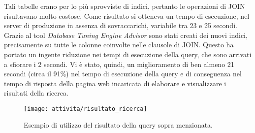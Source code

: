 Tali tabelle erano per lo più sprovviste di indici, pertanto le operazioni di JOIN risultavano molto costose. Come risultato si otteneva un tempo di esecuzione, nel server di produzione in assenza di sovraccarichi, variabile tra 23 e 25 secondi. Grazie al tool \textit{Database Tuning Engine Advisor} sono stati creati dei nuovi indici, precisamente su tutte le colonne coinvolte nelle clausole di JOIN. Questo ha portato un ingente riduzione nei tempi di esecuzione della query, che sono arrivati a sfiorare i 2 secondi. Vi è stato, quindi, un miglioramento di ben almeno 21 secondi (circa il 91\%) nel tempo di esecuzione della query e di conseguenza nel tempo di risposta della pagina web incaricata di elaborare e visualizzare i risultati della ricerca.\\
\begin{figure}[!h] 
	\centering 
	\texttt{[image: attivita/risultato\_ricerca]} 
	\caption{Esempio di utilizzo del risultato della query sopra menzionata.}
\end{figure}
